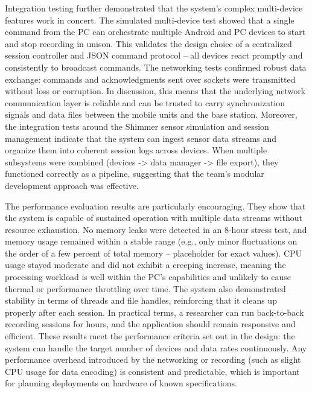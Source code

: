 \documentclass[11pt,a4paper]{report}
\begin{document}
Integration testing further demonstrated that the system's complex multi-device features work in concert. The simulated multi-device test showed that a single command from the PC can orchestrate multiple Android and PC devices to start and stop recording in unison. This validates the design choice of a centralized session controller and JSON command protocol – all devices react promptly and consistently to broadcast commands. The networking tests confirmed robust data exchange: commands and acknowledgments sent over sockets were transmitted without loss or corruption. In discussion, this means that the underlying network communication layer is reliable and can be trusted to carry synchronization signals and data files between the mobile units and the base station. Moreover, the integration tests around the Shimmer sensor simulation and session management indicate that the system can ingest sensor data streams and organize them into coherent session logs across devices. When multiple subsystems were combined (devices -> data manager -> file export), they functioned correctly as a pipeline, suggesting that the team's modular development approach was effective.

The performance evaluation results are particularly encouraging. They show that the system is capable of sustained operation with multiple data streams without resource exhaustion. No memory leaks were detected in an 8-hour stress test, and memory usage remained within a stable range (e.g., only minor fluctuations on the order of a few percent of total memory – placeholder for exact values). CPU usage stayed moderate and did not exhibit a creeping increase, meaning the processing workload is well within the PC's capabilities and unlikely to cause thermal or performance throttling over time. The system also demonstrated stability in terms of threads and file handles, reinforcing that it cleans up properly after each session. In practical terms, a researcher can run back-to-back recording sessions for hours, and the application should remain responsive and efficient. These results meet the performance criteria set out in the design: the system can handle the target number of devices and data rates continuously. Any performance overhead introduced by the networking or recording (such as slight CPU usage for data encoding) is consistent and predictable, which is important for planning deployments on hardware of known specifications.
\end{document}
